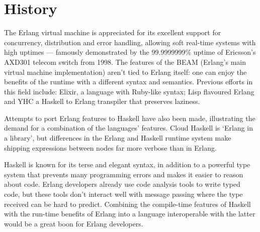 \section{History}

The Erlang virtual machine is appreciated for its excellent support for
concurrency, distribution and error handling, allowing soft real-time systems
with high uptimes --- famously demonstrated by the 99.9999999\% uptime of
Ericsson’s AXD301 telecom switch from 1998\cite{ninenines}. The features of the BEAM (Erlang’s
main virtual machine implementation) aren't tied to Erlang itself: one can
enjoy the benefits of the runtime with a different syntax and semantics.
Previous efforts in this field include: Elixir\cite{elixir}, a language with Ruby-like
syntax; Lisp flavoured Erlang\cite{lfe} and YHC\cite{yhc} a Haskell
to Erlang transpiler that preserves laziness.

Attempts to port Erlang features to Haskell have also been made, illustrating
the demand for a combination of the languages’ features. Cloud Haskell\cite{cloudhaskell} is
‘Erlang in a library’, but differences in the Erlang and Haskell runtime
system make shipping expressions between nodes far more verbose than in Erlang.

Haskell is known for its terse and elegant syntax, in addition to a powerful
type system that prevents many programming errors and makes it easier to
reason about code. Erlang developers already use code analysis tools to write
typed code, but these tools don’t interact well with message passing where the type received can be hard to predict. Combining the compile-time features of Haskell with the run-time benefits of Erlang into a language interoperable with the latter would be a great boon for Erlang developers.

